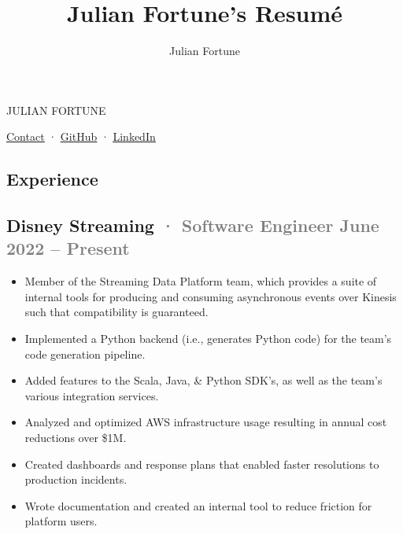 \documentclass[12pt]{article} %
\title{Julian Fortune's Resumé}
\author{Julian Fortune}
\providecommand{\tightlist}{%
  \setlength{\itemsep}{0pt}\setlength{\parskip}{0pt}}
\let\defaultref\href
\renewcommand{\href}[2]{%
  \defaultref{#1}{\ul{#2}}%
}
\newcommand{\link}[2]{\href{#1}{#2}}
\renewcommand{\emph}[1]{%
  \textcolor{gray}{#1}%
}
\def\separator{ · {}}
\begin{document}
\begin{bfseries}\begin{huge}
  {\selectfont%
    \MakeTextUppercase{Julian Fortune}
  }
\end{huge}\end{bfseries}

  \link{https://julianfortune.com}{Contact}\separator%
    \link{http://github.com/julianfortune}{GitHub}\separator%
\link{http://linkedin.com/in/julianfortune}{LinkedIn}%

%
\begin{paracol}{2}
\begin{raggedright}

\hypertarget{experience}{%
\section{Experience}\label{experience}}

\hypertarget{disney-streaming-software-engineer-june-2022-present}{%
\subsection{\texorpdfstring{Disney Streaming \emph{· Software Engineer
\hfill June 2022 --
Present}}{Disney Streaming · Software Engineer June 2022 -- Present}}\label{disney-streaming-software-engineer-june-2022-present}}

\begin{itemize}
\tightlist
\item
  Member of the Streaming Data Platform team, which provides a suite of
  internal tools for producing and consuming asynchronous events over
  Kinesis such that compatibility is guaranteed.
\item
  Implemented a Python backend (i.e., generates Python code) for the
  team's code generation pipeline.
\item
  Added features to the Scala, Java, \& Python SDK's, as well as the
  team's various integration services.
\item
  Analyzed and optimized AWS infrastructure usage resulting in annual
  cost reductions over \$1M.
\item
  Created dashboards and response plans that enabled faster resolutions
  to production incidents.
\item
  Wrote documentation and created an internal tool to reduce friction
  for platform users.
\end{itemize}


\end{raggedright}
\end{paracol}
\end{document}

